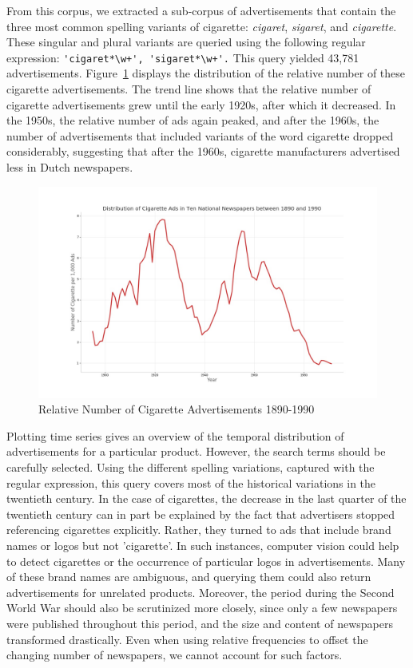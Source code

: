\documentclass[USenglish]{article}
\begin{document}
From this corpus, we extracted a sub-corpus of advertisements that contain the three most common spelling variants of cigarette: \textit{cigaret}, \textit{sigaret}, and \textit{cigarette}. These singular and plural variants are queried using the following regular expression: 
\verb/'cigaret*\w+', 'sigaret*\w+'./ This query yielded 43,781 advertisements. Figure~\ref{fig:cigarette_ad_curve} displays the distribution of the relative number of these cigarette advertisements. The trend line shows that the relative number of cigarette advertisements grew until the early 1920s, after which it decreased. In the 1950s, the relative number of ads again peaked, and after the 1960s, the number of advertisements that included variants of the word cigarette dropped considerably, suggesting that after the 1960s, cigarette manufacturers advertised less in Dutch newspapers.

\begin{figure}%
  \centering
  \includegraphics[width=.9\textwidth]{figures/cigarette_ads}%
  \caption{Relative Number of Cigarette Advertisements 1890-1990}%
  \label{fig:cigarette_ad_curve}%
\end{figure}

Plotting time series gives an overview of the temporal distribution of advertisements for a particular product. However, the search terms should be carefully selected. Using the different spelling variations, captured with the regular expression, this query covers most of the historical variations in the twentieth century. In the case of cigarettes, the decrease in the last quarter of the twentieth century can in part be explained by the fact that advertisers stopped referencing cigarettes explicitly. Rather, they turned to ads that include brand names or logos but not 'cigarette'. In such instances, computer vision could help to detect cigarettes or the occurrence of particular logos in advertisements. Many of these brand names are ambiguous, and querying them could also return advertisements for unrelated products. 
%
Moreover, the period during the Second World War should also be scrutinized more closely, since only a few newspapers were published throughout this period, and the size and content of newspapers transformed drastically. Even when using relative frequencies to offset the changing number of newspapers, we cannot account for such factors. 
\end{document}
